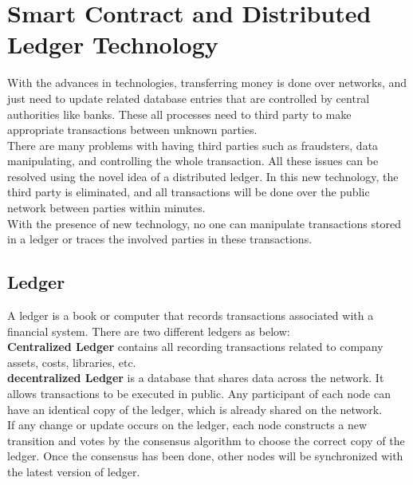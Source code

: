 \chapter{Smart Contract and Distributed Ledger Technology}
With the advances in technologies, transferring money is done over networks, and just need to update related database entries that are controlled by central authorities like banks. These all processes need to third party to make appropriate transactions between unknown parties. \\
There are many problems with having third parties such as fraudsters, data manipulating, and controlling the whole transaction. All these issues can be resolved using the novel idea of a distributed ledger. In this new technology, the third party is eliminated, and all transactions will be done over the public network between parties within minutes. \\
With the presence of new technology, no one can manipulate transactions stored in a ledger or traces the involved parties in these transactions\cite {Masood}. 
\section{Ledger} 
A ledger is a book or computer that records transactions associated with a financial system. There are two different ledgers as below: \\
\textbf{Centralized Ledger} contains all recording transactions related to company assets, costs, libraries, etc. \\
\textbf{decentralized Ledger } is a database that shares data across the network. It allows transactions to be executed in public. Any participant of each node can have an identical copy of the ledger, which is already shared on the network.\\
If any change or update occurs on the ledger, each node constructs a new transition and votes by the consensus algorithm to choose the correct copy of the ledger. Once the consensus has been done, other nodes will be synchronized with the latest version of ledger\cite{Markos}.

